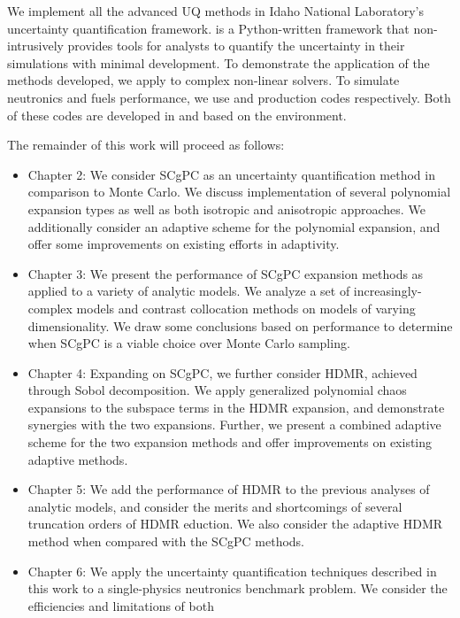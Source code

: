 We implement all the advanced UQ methods in Idaho National Laboratory's \raven{} \cite{raven}
uncertainty quantification framework. \raven{} is a Python-written framework that non-intrusively provides
tools for analysts to quantify the uncertainty in their simulations with minimal development.  To demonstrate
the application of the methods developed, we apply \raven{} to complex non-linear solvers.
To simulate neutronics and fuels performance, we use \rattlesnake{} \cite{rattlesnake} and 
\bison{} \cite{bison,mammoth} production codes respectively.
Both of these codes are developed in and based on the \moose{} \cite{moose} environment.

The remainder of this work will proceed as follows:

\begin{itemize}
  \item Chapter 2: We consider SCgPC as an uncertainty
    quantification method in comparison to Monte Carlo.  We discuss implementation of several polynomial
    expansion types as well as both isotropic and anisotropic approaches.  We additionally consider an
    adaptive scheme for the polynomial expansion, and offer some improvements on existing efforts in
    adaptivity.
  \item Chapter 3: We present the performance of SCgPC
    expansion methods as applied to a variety of analytic models.  We analyze a set of increasingly-complex
    models and contrast collocation methods on models of varying dimensionality.  We draw some conclusions
    based on performance to determine when SCgPC is a viable choice over Monte Carlo sampling.
  \item Chapter 4: Expanding on SCgPC, we further consider
    HDMR, achieved through Sobol decomposition.  We apply generalized polynomial
    chaos expansions to the subspace terms in the HDMR expansion, and demonstrate
    synergies with the two expansions.  Further, we present a combined adaptive scheme for the two expansion
    methods and offer improvements on existing adaptive methods.
  \item Chapter 5: We add the performance of HDMR to the previous analyses of analytic
    models, and consider the merits and shortcomings of several truncation orders of HDMR 
    eduction.  We also consider the adaptive HDMR method when compared with the SCgPC
    methods.
  \item Chapter 6: We apply the uncertainty quantification techniques described in this work to a
    single-physics neutronics benchmark problem.  We consider the efficiencies and limitations of both

\end{itemize}
